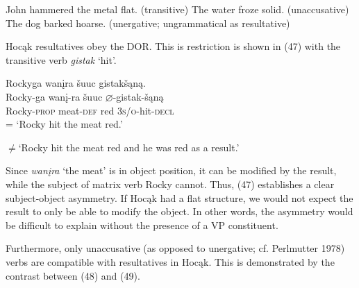 \documentclass[output=paper]{LSP/langsci}
\begin{document}
\begin{exe}
\ex
\begin{xlist}
\ex John hammered the metal flat.	(transitive)
\ex The water froze solid.						(unaccusative)
\ex *The dog barked hoarse.	(unergative; ungrammatical as resultative)
\end{xlist}
\end{exe}
	
Hoc\k{a}k resultatives obey the DOR. This is restriction is shown in (47) with the transitive verb \textit{gistak} `hit'.

\begin{exe}
\ex 
\glll Rockyga			wan\k{i}ra			\v{s}uuc 		gistak\v{s}\k{a}n\k{a}.\\
Rocky-ga		wan\k{i}-ra		\v{s}uuc		$\varnothing$-gistak-\v{s}\k{a}n\k{a} \\
Rocky-\textsc{prop}	meat-\textsc{def}	red			\textsc{3s/o}-hit-\textsc{decl} \\
\trans = `Rocky hit the meat red.'

$\neq$`Rocky hit the meat red and he was red as a result.'
\end{exe}

Since \textit{wan\k{i}ra} `the meat' is in object position, it can be modified by the result, while the subject of matrix verb Rocky cannot. Thus, (47) establishes a clear subject-object asymmetry. If Hoc\k{a}k had a flat structure, we would not expect the result to only be able to modify the object. In other words, the asymmetry would be difficult to explain without the presence of a VP constituent.
	
Furthermore, only unaccusative (as opposed to unergative; cf. Perlmutter 1978) verbs are compatible with resultatives in Hoc\k{a}k. This is demonstrated by the contrast between (48) and (49).
\end{document}
